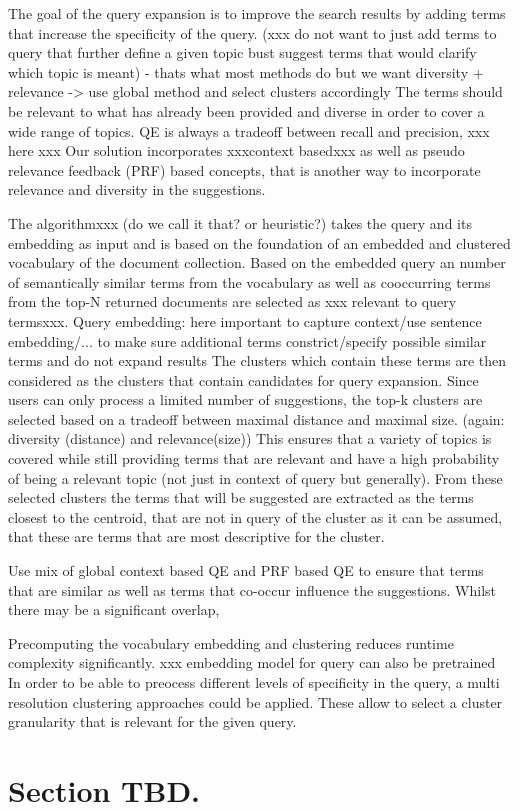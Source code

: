 The goal of the query expansion is to improve the search results by adding terms that increase the specificity of the query. 
(xxx do not want to just add terms to query that further define a given topic bust suggest terms that would clarify which topic is meant) - thats what most methods do but we want diversity + relevance -> use global method and select clusters accordingly
The terms should be relevant to what has already been provided and diverse in order to cover a wide range of topics. 
QE is always a tradeoff between recall and precision, xxx here xxx
Our solution incorporates xxxcontext basedxxx as well as pseudo relevance feedback (PRF) based concepts, that is another way to incorporate relevance and diversity in the suggestions.

The algorithmxxx (do we call it that? or heuristic?) takes the query and its embedding as input and is based on the foundation of an embedded and clustered vocabulary of the document collection.
Based on the embedded query an number of semantically similar terms from the vocabulary as well as cooccurring terms from the top-N returned documents are selected as xxx relevant to query termsxxx.
Query embedding: here important to capture context/use sentence embedding/... to make sure additional terms constrict/specify possible similar terms and do not expand results
The clusters which contain these terms are then considered as the clusters that contain candidates for query expansion.
Since users can only process a limited number of suggestions, the top-k clusters are selected based on a tradeoff between maximal distance and maximal size. (again: diversity (distance) and relevance(size))
This ensures that a variety of topics is covered while still providing terms that are relevant and have a high probability of being a relevant topic (not just in context of query but generally).
From these selected clusters the terms that will be suggested are extracted as the terms closest to the centroid, that are not in query of the cluster as it can be assumed, that these are terms that are most descriptive for the cluster.

Use mix of global context based QE and PRF based QE to ensure that terms that are similar as well as terms that co-occur influence the suggestions. Whilst there may be a significant overlap, 


Precomputing the vocabulary embedding and clustering reduces runtime complexity significantly. xxx embedding model for query can also be pretrained
In order to be able to preocess different levels of specificity in the query, a multi resolution clustering approaches could be applied. These allow to select a cluster granularity that is relevant for the given query.

\section{Section TBD.}



